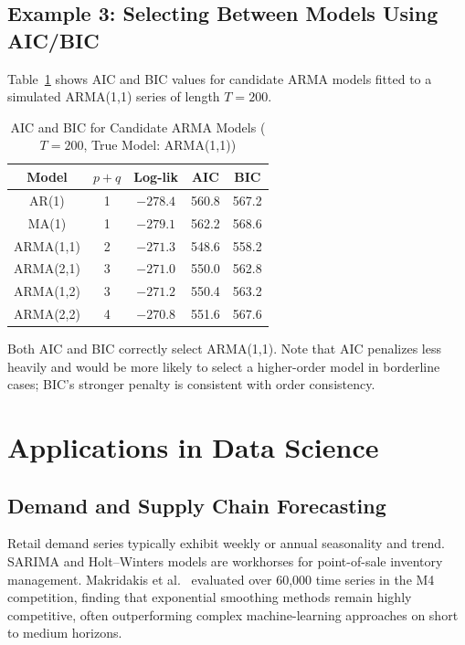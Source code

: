 \documentclass[conference]{IEEEtran}
\theoremstyle{definition}
\begin{document}
\subsection{Example 3: Selecting Between Models Using AIC/BIC}

Table~\ref{tab:aic_bic} shows AIC and BIC values for candidate ARMA models
fitted to a simulated ARMA(1,1) series of length $T=200$.

\begin{table}[htbp]
\centering
\caption{AIC and BIC for Candidate ARMA Models ($T=200$, True Model: ARMA(1,1))}
\label{tab:aic_bic}
\begin{tabular}{ccccc}
\toprule
\textbf{Model} & \textbf{$p+q$} & \textbf{Log-lik} & \textbf{AIC} & \textbf{BIC}\\
\midrule
AR(1)         & 1 & $-278.4$ & 560.8 & 567.2 \\
MA(1)         & 1 & $-279.1$ & 562.2 & 568.6 \\
ARMA(1,1)     & 2 & $-271.3$ & 548.6 & 558.2 \\
ARMA(2,1)     & 3 & $-271.0$ & 550.0 & 562.8 \\
ARMA(1,2)     & 3 & $-271.2$ & 550.4 & 563.2 \\
ARMA(2,2)     & 4 & $-270.8$ & 551.6 & 567.6 \\
\bottomrule
\end{tabular}
\end{table}

Both AIC and BIC correctly select ARMA(1,1). Note that AIC penalizes less
heavily and would be more likely to select a higher-order model in borderline
cases; BIC's stronger penalty is consistent with order consistency.

\section{Applications in Data Science}
\label{sec:applications}

\subsection{Demand and Supply Chain Forecasting}

Retail demand series typically exhibit weekly or annual seasonality and
trend. SARIMA and Holt--Winters models are workhorses for point-of-sale
inventory management. Makridakis et al.~\cite{makridakis2018m4} evaluated
over 60,000 time series in the M4 competition, finding that exponential
smoothing methods remain highly competitive, often outperforming complex
machine-learning approaches on short to medium horizons.
\end{document}
